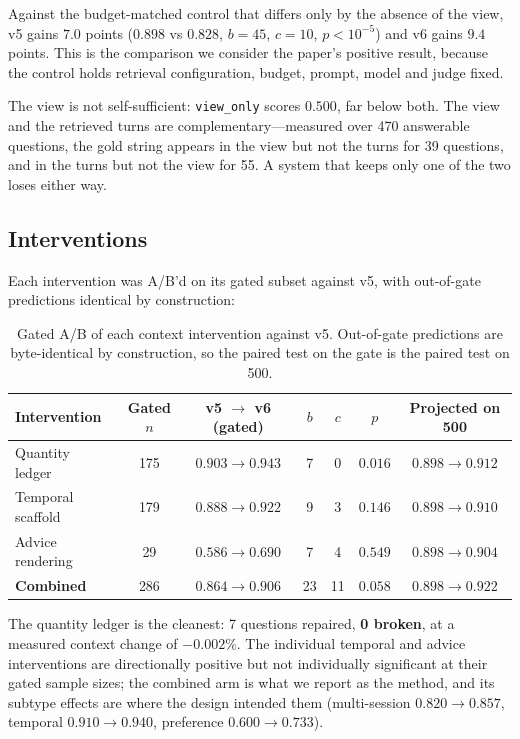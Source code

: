 \documentclass[11pt]{article}
\newcommand{\arm}[1]{\texttt{#1}}
\begin{document}
Against the budget-matched control that differs only by the absence of the view, v5 gains $7.0$ points ($0.898$ vs $0.828$, $b = 45$, $c = 10$, $p < 10^{-5}$) and v6 gains $9.4$ points. This is the comparison we consider the paper's positive result, because the control holds retrieval configuration, budget, prompt, model and judge fixed.

The view is not self-sufficient: \arm{view\_only} scores $0.500$, far below both. The view and the retrieved turns are complementary---measured over 470 answerable questions, the gold string appears in the view but not the turns for 39 questions, and in the turns but not the view for 55. A system that keeps only one of the two loses either way.

\subsection{Interventions}
\label{sec:interventions}

Each intervention was A/B'd on its gated subset against v5, with out-of-gate predictions identical by construction:

\begin{table}[ht]
\centering
\small
\begin{tabular}{@{}lcccccc@{}}
\toprule
\textbf{Intervention} & \textbf{Gated $n$} & \textbf{v5 $\rightarrow$ v6 (gated)} & $b$ & $c$ & $p$ & \textbf{Projected on 500} \\
\midrule
Quantity ledger    & 175 & $0.903 \rightarrow 0.943$ & 7 & 0 & $0.016$ & $0.898 \rightarrow 0.912$ \\
Temporal scaffold  & 179 & $0.888 \rightarrow 0.922$ & 9 & 3 & $0.146$ & $0.898 \rightarrow 0.910$ \\
Advice rendering   & 29  & $0.586 \rightarrow 0.690$ & 7 & 4 & $0.549$ & $0.898 \rightarrow 0.904$ \\
\textbf{Combined}  & 286 & $0.864 \rightarrow 0.906$ & 23 & 11 & $0.058$ & $0.898 \rightarrow \mathbf{0.922}$ \\
\bottomrule
\end{tabular}
\caption{Gated A/B of each context intervention against v5. Out-of-gate predictions are byte-identical by construction, so the paired test on the gate is the paired test on 500.}
\end{table}

The quantity ledger is the cleanest: 7 questions repaired, \textbf{0 broken}, at a measured context change of $-0.002\%$. The individual temporal and advice interventions are directionally positive but not individually significant at their gated sample sizes; the combined arm is what we report as the method, and its subtype effects are where the design intended them (multi-session $0.820 \rightarrow 0.857$, temporal $0.910 \rightarrow 0.940$, preference $0.600 \rightarrow 0.733$).
\end{document}

